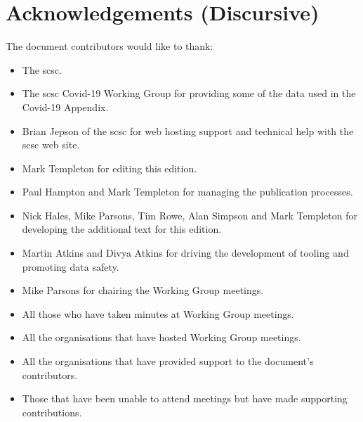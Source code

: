 %
%
\section{Acknowledgements (Discursive)} \label{bkm:acknowledgements}


The document contributors would like to thank:
\begin{itemize}
  \item The \gls{scsc}.
  \item The \gls{scsc} Covid-19 Working Group for providing some of the data used in the Covid-19 Appendix.
  \item Brian Jepson of the \gls{scsc} for web hosting support and technical help with the \gls{scsc} web site.
  \item
    Mark Templeton for editing this edition.
  \item Paul Hampton
    and
    Mark Templeton for managing the publication processes.
  \item
    Nick Hales, Mike Parsons, Tim Rowe, Alan Simpson and Mark Templeton
    for developing the additional text for this edition.
  \item
    Martin Atkins and Divya Atkins for driving the development of tooling and promoting data safety.
  \item Mike Parsons for chairing the Working Group meetings.
  \item All those who have taken minutes at Working Group meetings.
  \item
    All the organisations that have hosted Working Group meetings.
  \item All the organisations that have provided support to the document's contributors.
  \item Those that have been unable to attend meetings but have made supporting contributions.
\end{itemize}
